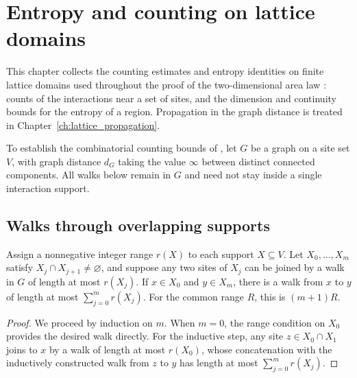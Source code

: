 \chapter{Entropy and counting on lattice domains}
\label{ch:area_graph_foundations}

This chapter collects the counting estimates and entropy identities on finite
lattice domains used throughout the proof of the two-dimensional area law
\cite[Section~2]{OpenAI2026AreaLaw}: counts of the interactions near a set of
sites, and the dimension and continuity bounds for the entropy of a region.
Propagation in the graph distance is treated in
Chapter~\ref{ch:lattice_propagation}.


To establish the combinatorial counting bounds of
\cite[Sections~2 and~4]{OpenAI2026AreaLaw}, let $G$ be a graph on a site
set $V$, with graph distance $d_G$ taking the value $\infty$ between
distinct connected components. All walks below remain in $G$ and need
not stay inside a single interaction support.

\section{Walks through overlapping supports}

\begin{lemma}
    \label{thm:area_chain_walk}
    \leanok
    Assign a nonnegative integer range $r(X)$ to each support $X\subseteq V$. Let
    $X_0,\ldots,X_m$ satisfy $X_j\cap X_{j+1}\ne\varnothing$, and suppose
    any two sites of $X_j$ can be joined by a walk in $G$ of length at most $r(X_j)$.
    If $x\in X_0$ and $y\in X_m$, there is a walk from $x$ to $y$ of length
    at most $\sum_{j=0}^m r(X_j)$. For the common range $R$, this is
    $(m+1)R$.
\end{lemma}
\begin{proof}
    \leanok
    We proceed by induction on $m$. When $m=0$, the range condition on
    $X_0$ provides the desired walk directly. For the inductive step, any
    site $z\in X_0\cap X_1$ joins to $x$ by a walk of length at most
    $r(X_0)$, whose concatenation with the inductively constructed walk
    from $z$ to $y$ has length at most $\sum_{j=0}^m r(X_j)$.
\end{proof}

